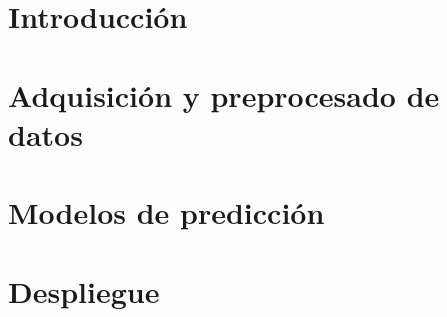 \documentclass[spanish,a4paper,12pt,oneside]{extreport}
\begin{document}

\tableofcontents

\newpage{\pagestyle{empty}}

\listoffigures

\newpage{\pagestyle{empty}}

\listoftables

\newpage{\pagestyle{empty}}

\newpage
\thispagestyle{empty}

\renewcommand{\thepage}{\arabic{page}}
\setcounter{page}{1}
\pagestyle{plain}

\chapter{\LARGE Introducción}
\label{chapter:intro}



\newpage{\pagestyle{empty}}
\thispagestyle{empty}

\chapter{\LARGE Adquisición y preprocesado de datos}
\label{chapter:dos}



\newpage{\pagestyle{empty}}
\thispagestyle{empty}

\chapter{\LARGE Modelos de predicción}
\label{chapter:tres}



\newpage{\pagestyle{empty}}
\thispagestyle{empty}

\chapter{\LARGE Despliegue}
\label{chapter:cuatro}
\end{document}
